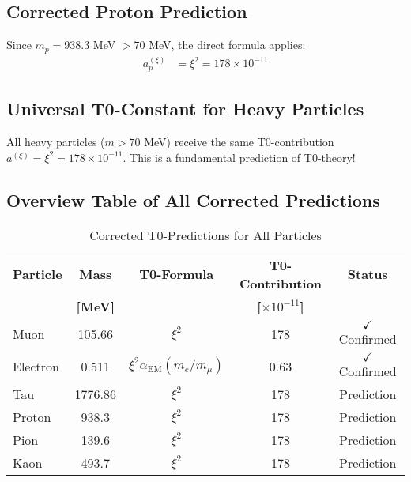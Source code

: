 \documentclass[12pt,a4paper]{article}
\newcommand{\xipar}{\xi}
\newcommand{\alphaEM}{\alpha_{\text{EM}}}
\begin{document}
	\subsection{Corrected Proton Prediction}
	
	Since $m_p = 938.3$ MeV $> 70$ MeV, the direct formula applies:
	\begin{align}
		a_p^{(\xipar)} &= \xipar^2 = 178 \times 10^{-11}
	\end{align}
	
	\subsection{Universal T0-Constant for Heavy Particles}
	
	\begin{important}
		All heavy particles ($m > 70$ MeV) receive the same T0-contribution $a^{(\xipar)} = \xipar^2 = 178 \times 10^{-11}$. This is a fundamental prediction of T0-theory!
	\end{important}
	
	\subsection{Overview Table of All Corrected Predictions}
	
	\begin{table}[H]
		\centering
		\caption{Corrected T0-Predictions for All Particles}
		\begin{tabular}{@{}lcccc@{}}
			\toprule
			\textbf{Particle} & \textbf{Mass} & \textbf{T0-Formula} & \textbf{T0-Contribution} & \textbf{Status} \\
			& \textbf{[MeV]} & & \textbf{[$\times 10^{-11}$]} & \\
			\midrule
			\rowcolor{green!30}
			Muon & 105.66 & $\xipar^2$ & 178 & $\checkmark$ Confirmed \\
			\rowcolor{green!30}
			Electron & 0.511 & $\xipar^2 \alphaEM (m_e/m_\mu)$ & 0.63 & $\checkmark$ Confirmed \\
			\rowcolor{blue!20}
			Tau & 1776.86 & $\xipar^2$ & 178 & Prediction \\
			\rowcolor{blue!20}
			Proton & 938.3 & $\xipar^2$ & 178 & Prediction \\
			\rowcolor{yellow!10}
			Pion & 139.6 & $\xipar^2$ & 178 & Prediction \\
			\rowcolor{yellow!10}
			Kaon & 493.7 & $\xipar^2$ & 178 & Prediction \\
			\bottomrule
		\end{tabular}
	\end{table}
	
\end{document}
